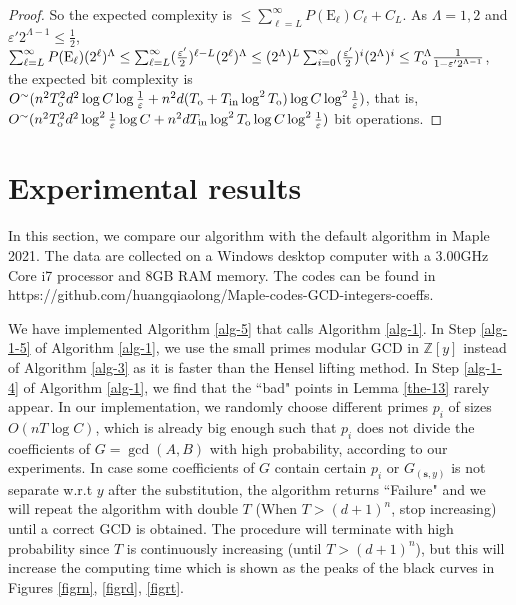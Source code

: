 \documentclass[final,20pt]{elsarticle}
\def\Z{{\mathbb Z}}
\def\inp{{\rm{in}}}
\def\out{{\rm{o}}}
\def\poly{\hbox{\rm{Poly}}}
\begin{document}
\begin{proof}
So the expected complexity is
$
\leq
\sum_{\ell=L}^{\infty}P(\mathrm{E}_\ell) C_{\ell}+C_{L}
$.
%
%
As $\Lambda=1,2$ and
$\varepsilon' 2^{\Lambda-1}\leq \frac12$,  $\sum_{\ell=L}^{\infty} P(\mathrm{E}_{\ell}) (2^{\ell})^{\Lambda}\leq \sum_{\ell=L}^{\infty}(\frac{\varepsilon'}{2})^{\ell-L} (2^{\ell})^{\Lambda} \leq (2^{\Lambda})^{L}\sum_{i=0}^{\infty}(\frac{\varepsilon'}{2})^i(2^{\Lambda})^i\leq T_{\out}^{\Lambda}\frac{1}{1-\varepsilon' 2^{\Lambda-1}}$, the expected bit complexity is
$O^\sim(n^2T_{\out}^2d^2\log C\log\frac{1}{\varepsilon}+n^2d(T_{\out}+T_{\inp}\log^2 T_{\out})\log C\log^2\frac{1}{\varepsilon})$,
that is, $O^\sim(n^2T_{\out}^2d^2\log^2 \frac{1}{\varepsilon}\log C+n^2dT_{\inp}\log^2 T_{\out}\log C\\ \log^2\frac{1}{\varepsilon})$ bit operations.
\end{proof}

\section{Experimental results}\label{sec-exp}
In this section, we compare our algorithm with the default algorithm in Maple 2021.
%
The data are collected on a Windows desktop computer with a
3.00GHz Core i7 processor and 8GB RAM memory.
The codes can be found in
https://github.com/huangqiaolong/Maple-codes-GCD-integers-coeffs.


We have implemented Algorithm \ref{alg-5} that calls Algorithm \ref{alg-1}. In Step \ref{alg-1-5} of Algorithm  \ref{alg-1}, we use the small primes modular GCD in $\Z[y]$ instead of Algorithm \ref{alg-3} as it is faster than the Hensel lifting method.
%
In Step \ref{alg-1-4} of  Algorithm \ref{alg-1}, we find that the ``bad" points in Lemma \ref{the-13} rarely appear.
In our implementation, we randomly choose different primes $p_i$ of sizes $O(nT\log C)$, which is already big enough such that $p_i$ does not divide the coefficients of $G=\gcd(A,B)$ with high probability, according to our experiments. In case some coefficients of $G$ contain certain $p_i$ or $G_{(\mathbf{s},y)}$ is not separate w.r.t $y$ after the substitution, the algorithm returns ``Failure" and we
will repeat the algorithm with double $T$ (When $T>(d+1)^n$, stop increasing) until a correct GCD is obtained. The procedure will terminate with high probability since $T$ is continuously increasing (until $T>(d+1)^n$), but this will increase the computing time which is shown
as the peaks of the black curves in Figures \ref{figrn}, \ref{figrd}, \ref{figrt}.
\end{document}
